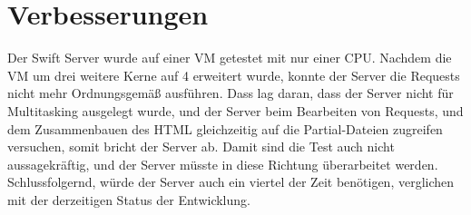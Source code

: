 \section{Verbesserungen}
Der Swift Server wurde auf einer VM getestet mit nur einer CPU. Nachdem die VM um drei weitere Kerne auf 4 erweitert wurde, konnte der Server die Requests nicht mehr Ordnungsgemäß ausführen. Dass lag daran, dass der Server nicht für Multitasking ausgelegt wurde, und der Server beim Bearbeiten von Requests, und dem Zusammenbauen des HTML gleichzeitig auf die Partial-Dateien zugreifen versuchen, somit bricht der Server ab. Damit sind die Test auch nicht aussagekräftig, und der Server müsste in diese Richtung überarbeitet werden. Schlussfolgernd, würde der Server auch ein viertel der Zeit benötigen, verglichen mit der derzeitigen Status der Entwicklung.



